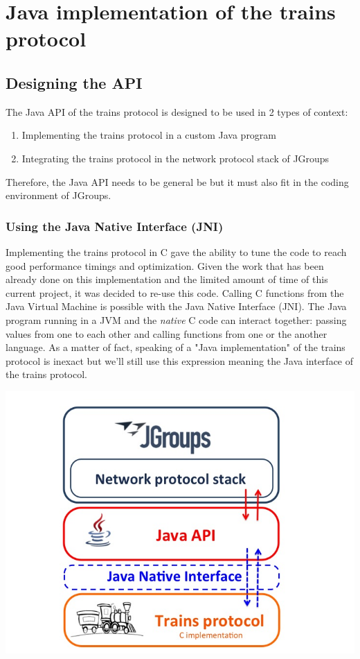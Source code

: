 \documentclass[a4paper,10pt]{report}
\begin{document}
\chapter{Java implementation of the trains protocol}

\section{Designing the API}

The Java API of the trains protocol is designed to be used in 2 types of context:
\begin{enumerate}
  \item Implementing the trains protocol in a custom Java program
  \item Integrating the trains protocol in the network protocol stack of JGroups\\
\end{enumerate}

Therefore, the Java API needs to be general be but it must also fit in the coding environment of JGroups.

\subsection{Using the Java Native Interface (JNI)}

Implementing the trains protocol in C gave the ability to tune the code to reach good performance timings and optimization.
Given the work that has been already done on this implementation and the limited amount of time of this current project, 
it was decided to re-use this code. Calling C functions from the Java Virtual Machine is possible with the Java Native Interface (JNI).
The Java program running in a JVM and the \textit{native} C code can interact together: passing values from one to each other and calling functions from one or the another
language. As a matter of fact, speaking of a "Java implementation" of the trains protocol is inexact but we'll still use this expression
meaning the Java interface of the trains protocol.\\

\begin{center}
\includegraphics[scale=0.4]{img/stackJNI.jpg}
\end{center}
\end{document}
